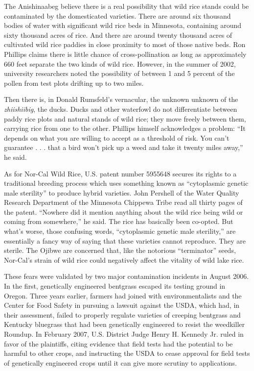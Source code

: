 The Anishinaabeg believe there is a real possibility that wild rice
stands could be contaminated by the domesticated varieties. There are
around six thousand bodies of water with significant wild rice beds in
Minnesota, containing around sixty thousand acres of rice. And there are
around twenty thousand acres of cultivated wild rice paddies in close
proximity to most of those native beds. Ron Phillips claims there is
little chance of cross-pollination as long as approximately 660 feet
separate the two kinds of wild rice. However, in the summer of 2002,
university researchers noted the possibility of between 1 and 5 percent
of the pollen from test plots drifting up to two miles.

Then there is, in Donald Rumsfeld's vernacular, the unknown unknown of
the \emph{zhiishiibig}, the ducks. Ducks and other waterfowl do not
differentiate between paddy rice plots and natural stands of wild rice;
they move freely between them, carrying rice from one to the other.
Phillips himself acknowledges a problem: ``It depends on what you are
willing to accept as a threshold of risk. You can't guarantee . . . that
a bird won't pick up a weed and take it twenty miles away,'' he said.

As for Nor-Cal Wild Rice, U.S. patent number 5955648 secures its rights
to a traditional breeding process which uses something known as
``cytoplasmic genetic male sterility'' to produce hybrid varieties. John
Pershell of the Water Quality Research Department of the Minnesota
Chippewa Tribe read all thirty pages of the patent. ``Nowhere did it
mention anything about the wild rice being wild or coming from
somewhere,'' he said. The rice has basically been co-opted. But what's
worse, those confusing words, ``cytoplasmic genetic male sterility,''
are essentially a fancy way of saying that these varieties cannot
reproduce. They are sterile. The Ojibwe are concerned that, like the
notorious ``terminator'' seeds, Nor-Cal's strain of wild rice could
negatively affect the vitality of wild lake rice.

These fears were validated by two major contamination incidents in
August 2006. In the first, genetically engineered bentgrass escaped its
testing ground in Oregon. Three years earlier, farmers had joined with
environmentalists and the Center for Food Safety in pursuing a lawsuit
against the USDA, which had, in their assessment, failed to properly
regulate varieties of creeping bentgrass and Kentucky bluegrass that had
been genetically engineered to resist the weedkiller Roundup. In
February 2007, U.S. District Judge Henry H. Kennedy Jr. ruled in favor
of the plaintiffs, citing evidence that field tests had the potential to
be harmful to other crops, and instructing the USDA to cease approval
for field tests of genetically engineered crops until it can give more
scrutiny to applications.

